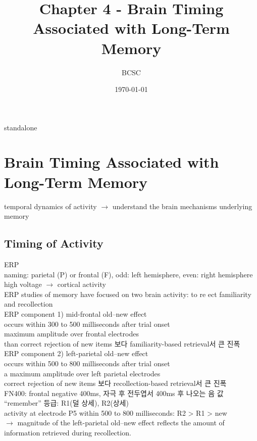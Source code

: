 \documentclass[../note.tex]{subfiles}
\title{Chapter 4 - Brain Timing Associated with Long-Term Memory}
\author{BCSC}
\date{\today}
\providecommand{\mainfile}{standalone}
\begin{document}
\ifx\mainfile\empty\else
    \maketitle
    \newpage
\fi

\chapter{Brain Timing Associated with Long-Term Memory}

temporal dynamics of activity $\rightarrow$ understand the brain mechanisms underlying memory

\section{Timing of Activity}
ERP\\
naming: parietal (P) or frontal (F), odd: left hemisphere, even: right hemisphere\\
high voltage $\rightarrow$ cortical activity\\

ERP studies of memory have focused on two brain activity: to re ect familiarity and recollection\\

ERP component 1) mid-frontal old–new effect\\
  occurs within 300 to 500 milliseconds after trial onset\\
  maximum amplitude over frontal electrodes\\
  than correct rejection of
new items 보다 familiarity-based retrieval서 큰 진폭\\

ERP component 2) left-parietal old–new effect\\
occurs within 500 to 800 milliseconds after trial
onset \\
a maximum amplitude over left parietal electrodes\\
correct rejection of new
items 보다 recollection-based retrieval서 큰 진폭\\


FN400: frontal negative 400ms, 자극 후 전두엽서 400ms 후 나오는 음 값\\

``remember'' 등급: R1(덜 상세), R2(상세)\\
activity at electrode P5 within 500 to 800 milliseconds: R2 > R1 > new\\
$\rightarrow$ magnitude of the left-parietal old–new effect reflects the amount of information retrieved during recollection.\\
\end{document}
